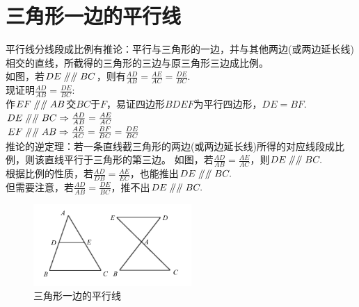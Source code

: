 \documentclass{ecnuthesis}
\newcommand\px{\mathrel{/\mkern-5mu/}}  %
\begin{document}
\section{三角形一边的平行线}
\begin{model}
    平行线分线段成比例有推论：平行与三角形的一边，并与其他两边(或两边延长线)相交的直线，所截得的三角形的三边与原三角形三边成比例。\\
    如图，若$DE\px\px BC$，则有$\frac{AD}{AB}=\frac{AE}{AC}=\frac{DE}{BC}.$ \\
    现证明$\frac{AD}{AB}=\frac{DE}{BC}$: \\
    作$EF\px\px AB$交$BC$于$F$，易证四边形$BDEF$为平行四边形，$DE=BF$.\\
    $DE \px \px BC \Rightarrow \frac{AD}{AB}=\frac{AE}{AC}$ \\
    $EF \px \px AB \Rightarrow \frac{AE}{AC}=\frac{BF}{BC}=\frac{DE}{BC}$ \\
    推论的逆定理：若一条直线截三角形的两边(或两边延长线)所得的对应线段成比例，则该直线平行于三角形的第三边。
    如图，若$\frac{AD}{AB}=\frac{AE}{AC}$，则$DE \px \px BC.$ \\
    根据比例的性质，若$\frac{AD}{DB}=\frac{AE}{EC}$，也能推出$DE \px \px BC.$ \\
    但需要注意，若$\frac{AD}{AB}=\frac{DE}{BC}$，推不出$DE\px \px BC.$ \\
\end{model}
\begin{figure}[H]
\centering
\includegraphics[width=6cm]{picture/804.png}
\caption{三角形一边的平行线}
\end{figure}
\clearpage
\end{document}
